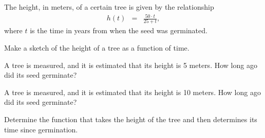 
\begin{problem}
\item The height, in meters, of a certain tree is given by the
  relationship
  \begin{eqnarray*}
    h(t) & = & \frac{50\cdot t}{25+t},
  \end{eqnarray*}
  where $t$ is the time in years from when the seed was germinated. 
  \begin{subproblem}
  \item Make a sketch of the height of a tree as a function of time.
    \vfill
  \item A tree is measured, and it is estimated that its height is 5
    meters. How long ago did its seed germinate?
    \vfill
  \item A tree is measured, and it is estimated that its height is 10
    meters. How long ago did its seed germinate?  
    \vfill
  \item Determine the function that takes the height of the tree and
    then determines its time since germination.
    \vfill
  \end{subproblem}

  \clearpage

\end{problem}


